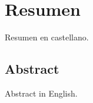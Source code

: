 

\newpage
\thispagestyle{empty}
\mbox{} %
\newpage

\chapter*{Resumen}
Resumen en castellano.

\begin{otherlanguage}{english}
\chapter*{Abstract}
Abstract in English.
\end{otherlanguage}
\newpage

\tableofcontents
